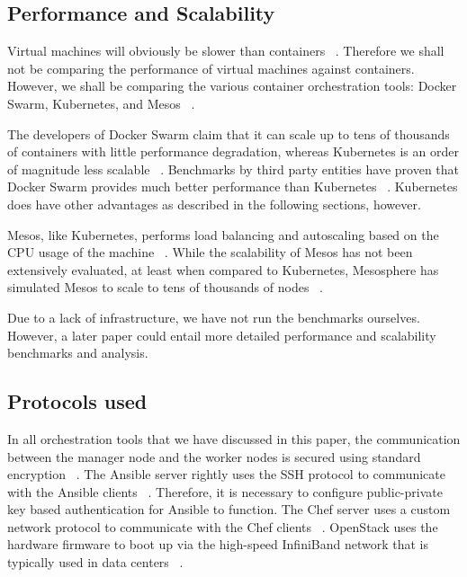 \documentclass[10pt,twocolumn]{article}
\begin{document}
\subsection{Performance and Scalability}

Virtual machines will obviously be slower than containers ~\cite{intro_containerisation}.
Therefore we shall not be comparing the performance of virtual machines against containers.
However, we shall be comparing the various container orchestration tools: Docker Swarm, Kubernetes, and Mesos ~\cite{docker_swarm, kubernetes, mesos}.

The developers of Docker Swarm claim that it can scale up to tens of thousands of containers with little performance degradation, whereas Kubernetes is an order of magnitude less scalable ~\cite{docker_swarm}.
Benchmarks by third party entities have proven that Docker Swarm provides much better performance than Kubernetes ~\cite{dockerswarm_vs_kubernetes}.
Kubernetes does have other advantages as described in the following sections, however.

Mesos, like Kubernetes, performs load balancing and autoscaling based on the CPU usage of the machine ~\cite{mesos}.
While the scalability of Mesos has not been extensively evaluated, at least when compared to Kubernetes, Mesosphere has simulated Mesos to scale to tens of thousands of nodes ~\cite{mesosphere_simulation}.

Due to a lack of infrastructure, we have not run the benchmarks ourselves.
However, a later paper could entail more detailed performance and scalability benchmarks and analysis.

\subsection{Protocols used}

In all orchestration tools that we have discussed in this paper, the communication between the manager node and the worker nodes is secured using standard encryption ~\cite{ansible, chef, openstack, docker_swarm, kubernetes, mesos}.
The Ansible server rightly uses the SSH protocol to communicate with the Ansible clients ~\cite{ansible}.
Therefore, it is necessary to configure public-private key based authentication for Ansible to function.
The Chef server uses a custom network protocol to communicate with the Chef clients ~\cite{chef}.
OpenStack uses the hardware firmware to boot up via the high-speed InfiniBand network that is typically used in data centers ~\cite{openstack, intro_infiniband}.
\end{document}
